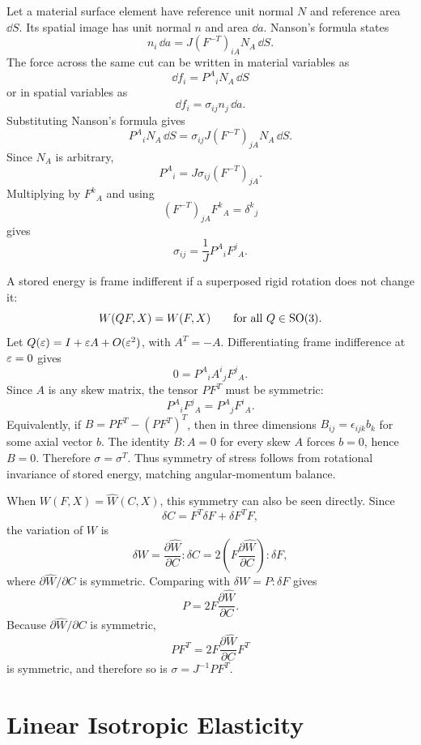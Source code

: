 \begin{derivation}
Let a material surface element have reference unit normal \(N\) and reference
area \(\dd S\). Its spatial image has unit normal \(n\) and area \(\dd a\).
Nanson's formula states
\[
  n_i\,\dd a
  =
  J(F^{-T})_{iA}N_A\,\dd S.
\]
The force across the same cut can be written in material variables as
\[
  \dd f_i=P^A{}_iN_A\,\dd S
\]
or in spatial variables as
\[
  \dd f_i=\sigma_{ij}n_j\,\dd a.
\]
Substituting Nanson's formula gives
\[
  P^A{}_iN_A\,\dd S
  =
  \sigma_{ij}J(F^{-T})_{jA}N_A\,\dd S.
\]
Since \(N_A\) is arbitrary,
\[
  P^A{}_i
  =
  J\sigma_{ij}(F^{-T})_{jA}.
\]
Multiplying by \(F^k{}_A\) and using
\[
  (F^{-T})_{jA}F^k{}_A=\delta^k{}_j
\]
gives
\[
  \boxed{
  \sigma_{ij}
  =
  \frac1J P^A{}_iF^j{}_A.
  }
\]
\end{derivation}

A stored energy is frame indifferent if a superposed rigid rotation does not
change it:
\[
  W(QF,X)=W(F,X)\qquad\text{for all }Q\in\operatorname{SO}(3).
\]
Let \(Q(\varepsilon)=I+\varepsilon A+O(\varepsilon^2)\), with \(A^T=-A\). Differentiating
frame indifference at \(\varepsilon=0\) gives
\[
  0=
  P^A{}_iA^i{}_jF^j{}_A.
\]
Since \(A\) is any skew matrix, the tensor \(PF^T\) must be symmetric:
\[
  P^A{}_iF^j{}_A=P^A{}_jF^i{}_A.
\]
Equivalently, if \(B=PF^T-(PF^T)^T\), then in three dimensions
\(B_{ij}=\epsilon_{ijk}b_k\) for some axial vector \(b\). The identity
\(B:A=0\) for every skew \(A\) forces \(b=0\), hence \(B=0\).
Therefore \(\sigma=\sigma^T\). Thus symmetry of stress follows from rotational
invariance of stored energy, matching angular-momentum balance.

When \(W(F,X)=\widehat W(C,X)\), this symmetry can also be seen directly. Since
\[
  \delta C=F^T\delta F+\delta F^TF,
\]
the variation of \(W\) is
\[
  \delta W
  =
  \frac{\partial\widehat W}{\partial C}:\delta C
  =
  2\left(F\frac{\partial\widehat W}{\partial C}\right):\delta F,
\]
where \(\partial\widehat W/\partial C\) is symmetric. Comparing with
\(\delta W=P:\delta F\) gives
\[
  P=2F\frac{\partial \widehat W}{\partial C}.
\]
Because \(\partial\widehat W/\partial C\) is symmetric,
\[
  PF^T=2F\frac{\partial\widehat W}{\partial C}F^T
\]
is symmetric, and therefore so is \(\sigma=J^{-1}PF^T\).

\section{Linear Isotropic Elasticity}
\label{sec:linear-isotropic-elasticity}

